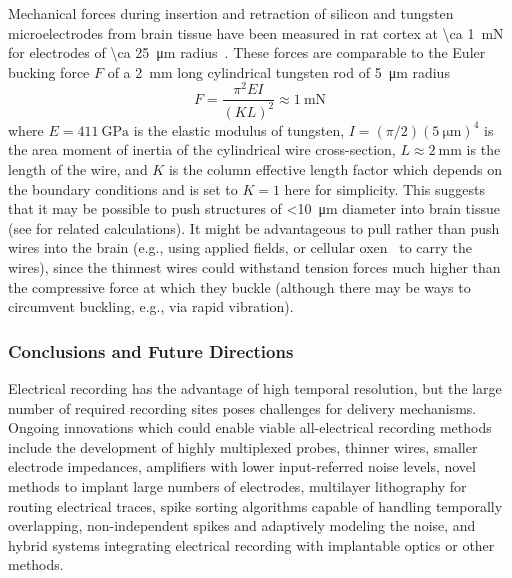 Mechanical forces during insertion and retraction of silicon and tungsten microelectrodes from brain tissue have been measured in rat cortex at \SI{\ca 1}{\milli\newton} for electrodes of \SI{\ca 25}{\micro\meter} radius~\cite{jensen03}.
These forces are comparable to the Euler bucking force $F$ of a \SI{2}{\milli\meter} long cylindrical tungsten rod of \SI{5}{\micro\meter} radius
\[F=\frac{\pi^2 E I}{(K L)^2} \approx \SI{1}{\milli\newton}\]
where $E=\SI{411}{\giga\pascal}$ is the elastic modulus of tungsten, $I=(\pi/2)(\SI{5}{\micro\meter})^4$ is the area moment of inertia of the cylindrical wire cross-section, $L\approx\SI{2}{\milli\meter}$ is the length of the wire, and $K$ is the column effective length factor which depends on the boundary conditions and is set to $K=1$ here for simplicity.
This suggests that it may be possible to push structures of \SI{<10}{\micro\meter} diameter into brain tissue (see \cite{najafi90} for related calculations). It might be advantageous to pull rather than push wires into the brain (e.g., using applied fields, or cellular oxen~\cite{Weibel23082005} to carry the wires), since the thinnest wires could withstand tension forces much higher than the compressive force at which they buckle (although there may be ways to circumvent buckling, e.g., via rapid vibration).

\subsubsection{Conclusions and Future Directions}

Electrical recording has the advantage of high temporal resolution, but the large number of required recording sites poses challenges for delivery mechanisms.
Ongoing innovations which could enable viable all-electrical recording methods include
the development of highly multiplexed probes, thinner wires, smaller electrode impedances,
amplifiers with lower input-referred noise levels, novel methods to implant large numbers of electrodes,
multilayer lithography for routing electrical traces, spike sorting algorithms capable of handling temporally overlapping, non-independent spikes and adaptively modeling the noise, and hybrid systems integrating electrical recording with
implantable optics or other methods.

